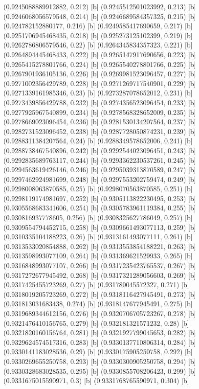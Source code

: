{{{(0.9245088889912882, 0.212) [b] 
(0.9245512501023992, 0.213) [b] 
(0.9246068056579548, 0.214) [b] 
(0.9246689584357325, 0.215) [b] 
(0.924782152880177, 0.216) [b] 
(0.9249585417690659, 0.217) [b] 
(0.9251706945468435, 0.218) [b] 
(0.925273125102399, 0.219) [b] 
(0.9262786806579546, 0.22) [b] 
(0.9264345834357323, 0.221) [b] 
(0.9264894445468433, 0.222) [b] 
(0.9265147917690656, 0.223) [b] 
(0.9265415278801766, 0.224) [b] 
(0.9265540278801766, 0.225) [b] 
(0.9267901936105136, 0.226) [b] 
(0.9269981523096457, 0.227) [b] 
(0.9271002356429789, 0.228) [b] 
(0.9271269717540901, 0.229) [b] 
(0.9271339161985346, 0.23) [b] 
(0.9273287078652012, 0.231) [b] 
(0.9273439856429788, 0.232) [b] 
(0.9274356523096454, 0.233) [b] 
(0.9277925967540899, 0.234) [b] 
(0.9278568328652009, 0.235) [b] 
(0.9278669023096454, 0.236) [b] 
(0.9281530134207564, 0.237) [b] 
(0.9282731523096452, 0.238) [b] 
(0.9287728050874231, 0.239) [b] 
(0.9288311384207564, 0.24) [b] 
(0.9288349578652006, 0.241) [b] 
(0.9288738467540896, 0.242) [b] 
(0.9292544023096451, 0.243) [b] 
(0.9292835689763117, 0.244) [b] 
(0.9293362230537261, 0.245) [b] 
(0.9294563619426146, 0.246) [b] 
(0.9295039313870589, 0.247) [b] 
(0.9297462924981699, 0.248) [b] 
(0.9297553202759474, 0.249) [b] 
(0.9298008063870585, 0.25) [b] 
(0.9298070563870585, 0.251) [b] 
(0.9298119174981697, 0.252) [b] 
(0.9305113822230495, 0.253) [b] 
(0.9305568683341606, 0.254) [b] 
(0.9305783961119384, 0.255) [b] 
(0.930816937778605, 0.256) [b] 
(0.9308325627786049, 0.257) [b] 
(0.9309554794452715, 0.258) [b] 
(0.9309661493077113, 0.259) [b] 
(0.9310335104188223, 0.26) [b] 
(0.9313161493077111, 0.261) [b] 
(0.9313533020854888, 0.262) [b] 
(0.9313553854188221, 0.263) [b] 
(0.9313598993077109, 0.264) [b] 
(0.931369621529933, 0.265) [b] 
(0.9316848993077107, 0.266) [b] 
(0.9317235423765537, 0.267) [b] 
(0.9317272677945492, 0.268) [b] 
(0.9317321289056603, 0.269) [b] 
(0.9317425455723269, 0.27) [b] 
(0.931780045572327, 0.271) [b] 
(0.9318019205723269, 0.272) [b] 
(0.9318116427945491, 0.273) [b] 
(0.931813031683438, 0.274) [b] 
(0.9318147677945491, 0.275) [b] 
(0.9319689344612156, 0.276) [b] 
(0.9320706705723267, 0.278) [b] 
(0.9321476410156765, 0.279) [b] 
(0.932181321571232, 0.28) [b] 
(0.9321820160156764, 0.281) [b] 
(0.9321927799045653, 0.282) [b] 
(0.9329624574517316, 0.283) [b] 
(0.9330137710806314, 0.284) [b] 
(0.9330141183028536, 0.29) [b] 
(0.9330175905250758, 0.292) [b] 
(0.9330269655250758, 0.293) [b] 
(0.9330300905250758, 0.294) [b] 
(0.9330328683028535, 0.295) [b] 
(0.9330855708206423, 0.299) [b] 
(0.9331675015590971, 0.3) [b] 
(0.9331768765590971, 0.304) [b] 
}}}

